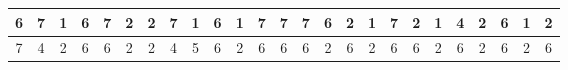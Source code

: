 \begin{sidewaystable}[]
\begin{tabular}{|c|c|c|c|c|c|c|c|c|c|c|c|c|c|c|c|c|c|c|c|c|c|c|c|c|}
    6       & 7                                               & 1                                               & 6                                               & 7                                               & 2                                               & 2                                               & 7                                               & 1                                               & 6                                               & 1                                                & 7                                                & 7                                                & 7                                               & 6                                               & 2                                               & 1                                               & 7                                               & 2                                               & 1                                               & 4                                               & 2                                               & 6                                                & 1                                                & 2                                                \\ \hline
    7       & 4                                               & 2                                               & 6                                               & 6                                               & 2                                               & 2                                               & 4                                               & 5                                               & 6                                               & 2                                                & 6                                                & 6                                                & 6                                               & 2                                               & 6                                               & 2                                               & 6                                               & 6                                               & 2                                               & 6                                               & 2                                               & 6                                                & 2                                                & 6                                                \\ \hline

\end{tabular}
\end{sidewaystable}

